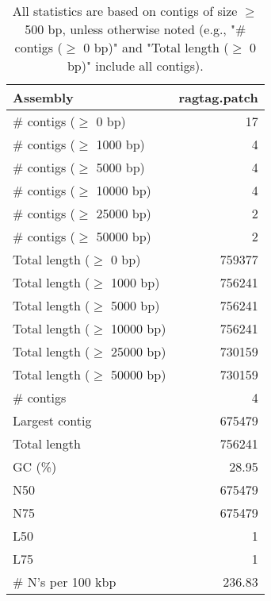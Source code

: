 \documentclass[12pt,a4paper]{article}
\begin{document}
\begin{table}[ht]
\begin{center}
\caption{All statistics are based on contigs of size $\geq$ 500 bp, unless otherwise noted (e.g., "\# contigs ($\geq$ 0 bp)" and "Total length ($\geq$ 0 bp)" include all contigs).}
\begin{tabular}{|l*{1}{|r}|}
\hline
Assembly & ragtag.patch \\ \hline
\# contigs ($\geq$ 0 bp) & 17 \\ \hline
\# contigs ($\geq$ 1000 bp) & 4 \\ \hline
\# contigs ($\geq$ 5000 bp) & 4 \\ \hline
\# contigs ($\geq$ 10000 bp) & 4 \\ \hline
\# contigs ($\geq$ 25000 bp) & 2 \\ \hline
\# contigs ($\geq$ 50000 bp) & 2 \\ \hline
Total length ($\geq$ 0 bp) & 759377 \\ \hline
Total length ($\geq$ 1000 bp) & 756241 \\ \hline
Total length ($\geq$ 5000 bp) & 756241 \\ \hline
Total length ($\geq$ 10000 bp) & 756241 \\ \hline
Total length ($\geq$ 25000 bp) & 730159 \\ \hline
Total length ($\geq$ 50000 bp) & 730159 \\ \hline
\# contigs & 4 \\ \hline
Largest contig & 675479 \\ \hline
Total length & 756241 \\ \hline
GC (\%) & 28.95 \\ \hline
N50 & 675479 \\ \hline
N75 & 675479 \\ \hline
L50 & 1 \\ \hline
L75 & 1 \\ \hline
\# N's per 100 kbp & 236.83 \\ \hline
\end{tabular}
\end{center}
\end{table}
\end{document}
